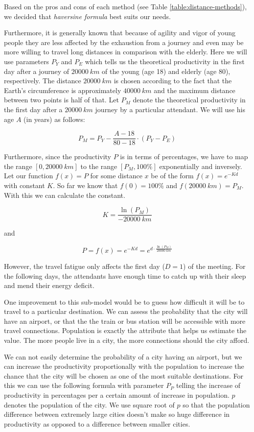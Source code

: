 Based on the pros and cons of each method (see Table \ref{table:distance-methods}), we decided that \emph{haversine formula} best suits our needs.

Furthermore, it is generally known that because of agility and vigor of young people they are less affected by the exhaustion from a journey and even may be more willing to travel long distances in comparison with the elderly. Here we will use parameters $P_Y$ and $P_E$ which tells us the theoretical productivity in the first day after a journey of $\SI{20000}{km}$ of the young (age 18) and elderly (age 80), respectively. The distance $\SI{20000}{km}$ is chosen according to the fact that the Earth's circumference is approximately $\SI{40000}{km}$ and the maximum distance between two points is half of that.
Let $P_M$ denote the theoretical productivity in the first day after a $\SI{20000}{km}$ journey by a particular attendant. We will use his age $A$ (in years) as follows:

$$P_M = P_Y - \frac{A - 18}{80 - 18} \cdot (P_Y - P_E) $$

Furthermore, since the productivity $P$ is in terms of percentages, we have to map the range $\left[ 0, \SI{20000}{km} \right]$ to the range $\left[ P_M, 100\% \right]$ exponentially and inversely. Let our function $f(x) = P$ for some distance $x$ be of the form $f(x) = e^{-Kd}$ with constant $K$. So far we know that $f(0) = 100\%$ and $f(\SI{20000}{km})=P_M$. With this we can calculate the constant.

$$K = \frac{\ln(P_M)}{-\SI{20000}{km}}$$

\noindent and

$$P = f(x) = e^{-Kd} = e^{d \cdot \frac{\ln(P_M)}{\SI{20000}{km}}}$$

However, the travel fatigue only affects the first day ($D=1$) of the meeting. For the following days, the attendants have enough time to catch up with their sleep and mend their energy deficit.

One improvement to this sub-model would be to guess how difficult it will be to travel to a particular destination. We can assess the probability that the city will have an airport, or that the the train or bus station will be accessible with more travel connections. Population is exactly the attribute that helps us estimate the value. The more people live in a city, the more connections should the city afford.

We can not easily determine the probability of a city having an airport, but we can increase the productivity proportionally with the population to increase the chance that the city will be chosen as one of the most suitable destinations. For this we can use the following formula with parameter $P_P$ telling the increase of productivity in percentages per a certain amount of increase in population. $p$ denotes the population of the city. We use square root of $p$ so that the population difference between extremely large cities doesn't make so huge difference in productivity as opposed to a difference between smaller cities.


